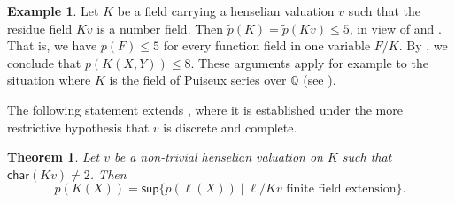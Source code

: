 \documentclass[12pt,leqno]{amsart}
\newcommand{\qq}{\mathbb Q}
\newcommand{\wt}[1]{\widetilde{{#1}}}
\renewcommand{\sup}{\mathsf{sup}}
\newcommand{\car}{\mathsf{char}}
\renewcommand{\leq}{\leqslant}
\numberwithin{equation}{section}
\newtheorem{thm}[equation]{Theorem}
\theoremstyle{definition}
\newtheorem{ex}[equation]{Example}
\theoremstyle{plain}
\begin{document}
\begin{ex}
Let $K$ be a field carrying a henselian valuation $v$ such that the residue field $Kv$ is a number field.
Then $\wt{p}(K)=\wt{p}(Kv)\leq 5$, in view of  and . That is, we have $p(F)\leq 5$ for every function field in one variable $F/K$. By , we  conclude that $p(K(X,Y))\leq 8$.
These arguments apply for example to the situation where $K$ is the field of Puiseux series over $\qq$ (see ).
\end{ex}


The following statement extends \cite[Cor.~6.9]{BGVG14}, where it is established under the more restrictive hypothesis that $v$ is discrete and complete.

\begin{thm}\label{nthv-rafufi-pyth}
Let $v$ be a non-trivial henselian valuation on $K$ such that\linebreak $\car(Kv) \neq 2$. 
Then \[p(K(X))=\sup \{p(\ell (X))\mid \ell/Kv\mbox{ finite field extension}\}.\]
\end{thm}
\end{document}
